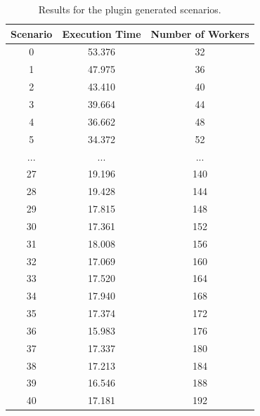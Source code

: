\begin{table}
    \centering
    \begin{tabular}{|c | c| c|}
    \hline
 {Scenario} &{Execution Time}& {Number of Workers} \\\hline\hline
0	&	53.376	&	32	\\
1	&	47.975	&	36	\\
2	&	43.410	&	40	\\
3	&	39.664	&	44	\\
4	&	36.662	&	48	\\
5	&	34.372	&	52	\\
...	&	...		&	...	\\
27	&	19.196	&	140	\\
28	&	19.428	&	144	\\
29	&	17.815	&	148	\\
30	&	17.361	&	152	\\
31	&	18.008	&	156	\\
32	&	17.069	&	160	\\
33	&	17.520	&	164	\\
34	&	17.940	&	168	\\
35	&	17.374	&	172	\\
36	&	15.983	&	176	\\
37	&	17.337	&	180	\\
38	&	17.213	&	184	\\
39	&	16.546	&	188	\\
40	&	17.181	&	192	\\\hline
    \end{tabular}
    \caption{Results for the plugin generated scenarios.}
\label{tab:mw-plug-res-s2f2m}
\end{table}




